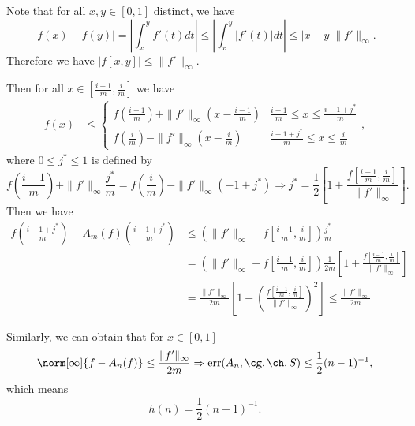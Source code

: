  Note that for all $x,y \in [0,1]$ distinct, we have
 $$|f(x)-f(y)|=\left|\int_{x}^{y}f'(t)dt\right|\leq \left|\int_{x}^{y}\left|f'(t)\right|dt\right|
 \leq |x-y|\|f'\|_{\infty}.$$
 Therefore we have $|f[x,y]|\leq \|f'\|_{\infty}.$

  Then for all $x \in \left[\frac{i-1}{m},\frac{i}{m}\right]$ we have
  \begin{align*}
  f(x)
  & \leq \left\{\begin{matrix}
  f\left(\frac{i-1}{m}\right)+\|f'\|_{\infty}\left(x-\frac{i-1}{m}\right) & \frac{i-1}{m} \leq x \leq \frac{i-1+j^{*}}{m} \\
  f\left(\frac{i}{m}\right)-\|f'\|_{\infty}\left(x-\frac{i}{m}\right) & \frac{i-1+j^{*}}{m} \leq x \leq \frac{i}{m}
  \end{matrix},\right.
  \end{align*}
where $0 \leq j^{*} \leq 1$ is defined by
$$f\left(\frac{i-1}{m}\right)+\|f'\|_{\infty}\frac{j^{*}}{m}=f\left(\frac{i}{m}\right)-\|f'\|_{\infty}\left(-1+j^{*}\right)
\Rightarrow j^{*}=\frac{1}{2}\left[1+\frac{f\left[\frac{i-1}{m},\frac{i}{m}\right]}{\|f'\|_{\infty}}\right].$$
Then we have
\begin{align*}
f\left(\frac{i-1+j^{*}}{m}\right)-A_{m}(f)\left(\frac{i-1+j^{*}}{m}\right) &
\leq \left(\|f'\|_{\infty}-f\left[\frac{i-1}{m},\frac{i}{m}\right]\right)\frac{j^{*}}{m}\\
& =\left(\|f'\|_{\infty}-f\left[\frac{i-1}{m},\frac{i}{m}\right]\right)\frac{1}{2m}\left[1+\frac{f\left[\frac{i-1}{m},\frac{i}{m}\right]}{\|f'\|_{\infty}}\right]\\
& =\frac{\|f'\|_{\infty}}{2m}\left[1-\left(\frac{f\left[\frac{i-1}{m},\frac{i}{m}\right]}{\|f'\|_{\infty}}\right)^{2}\right]\leq \frac{\|f'\|_{\infty}}{2m}
\end{align*}

Similarly, we can obtain that for $x \in [0,1]$
\begin{equation}\label{errorg}\norm[\infty]{f-A_{n}(f)} \leq \frac{\|f'\|_{\infty}}{2m} \Rightarrow \err(A_n,\cg,\ch,S) \leq \frac{1}{2}(n-1)^{-1},
\end{equation}
which means
$$h(n)=\frac{1}{2}(n-1)^{-1}.$$

